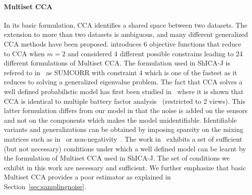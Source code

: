\documentclass[12pt]{report}
\begin{document}
\paragraph{Multiset CCA}
In its basic formulation, CCA identifies a shared space between two datasets.
The extension to more than two datasets is ambiguous, and many
different generalized CCA methods have been proposed. \cite{kettenring1971canonical} introduces 6 objective functions that reduce to CCA when $m=2$ and \cite{nielsen2002multiset} considered 4 different possible constrains leading to 24 different formulations of Multiset CCA. The formulation used in ShICA-J is refered to in~\cite{nielsen2002multiset} as SUMCORR with constraint 4 which is one of the fastest as it reduces to solving a generalized eigenvalue problem. The fact that CCA solves a well defined probabilistic model has first been studied in~\cite{bach2005probabilistic} where it is shown that CCA is identical to multiple battery factor analysis~\cite{browne1980factor} (restricted to 2 views). This latter formulation differs from our model in that the noise is added on the sensors and not on the components which makes the model unidentifiable. Identifiable variants and
generalizations can be obtained by imposing sparsity on the mixing matrices such as in~\cite{archambeau2008sparse, klami2014group, witten2009extensions} or non-negativity~\cite{DELEUS2011143}.
The work in~\cite{li2009joint} exhibits a set of sufficient (but not necessary) conditions under which a well defined model can be learnt by the formulation of Multiset CCA used in ShICA-J. The set of conditions we exhibit in this work are necessary and sufficient. We further emphasize that basic Multiset CCA provides a poor estimator as explained in Section~\ref{sec:samplingnoise}.
\end{document}
